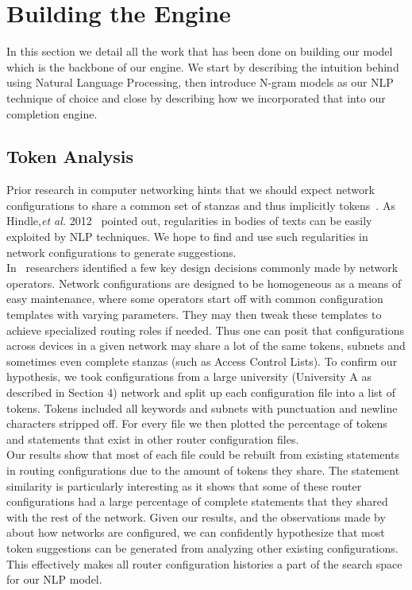 \section{Building the Engine}

In this section we detail all the work that has been done on building our model which is the backbone of our engine. We start by describing the intuition behind using Natural Language Processing, then introduce N-gram models as our NLP technique of choice and close by describing how we incorporated that into our completion engine.

\subsection{Token Analysis}
Prior research in computer networking hints that we should expect network configurations to share a common set of stanzas and thus implicitly tokens~\cite{Benson}. As Hindle,\textit{et al.} 2012~\cite{naturalness} pointed out, regularities in bodies of texts can be easily exploited by NLP techniques. We hope to find and use such regularities in network configurations to generate suggestions.\\

In~\cite{complexity} researchers identified a few key design decisions commonly made by network operators. Network configurations are designed to be homogeneous as a means of easy maintenance, where some operators start off with common configuration templates with varying parameters. They may then tweak these templates to achieve specialized routing roles if needed. Thus one can posit that configurations across devices in a given network may share a lot of the same tokens, subnets and sometimes even complete stanzas (such as Access Control Lists). To confirm our hypothesis, we took configurations from a large university (University A as described in Section 4) network and split up each configuration file into a list of tokens. Tokens included all keywords and subnets with punctuation and newline characters stripped off. For every file we then plotted the percentage of tokens and statements that exist in other router configuration files.\\

Our results show that most of each file could be rebuilt from existing statements in routing configurations due to the amount of tokens they share. The statement similarity is particularly interesting as it shows that some of these router configurations had a large percentage of complete statements that they shared with the rest of the network. Given our results, and the observations made by~\cite{complexity} about how networks are configured, we can confidently hypothesize that most token suggestions can be generated from analyzing other existing configurations. This effectively makes all router configuration histories a part of the search space for our NLP model. 

